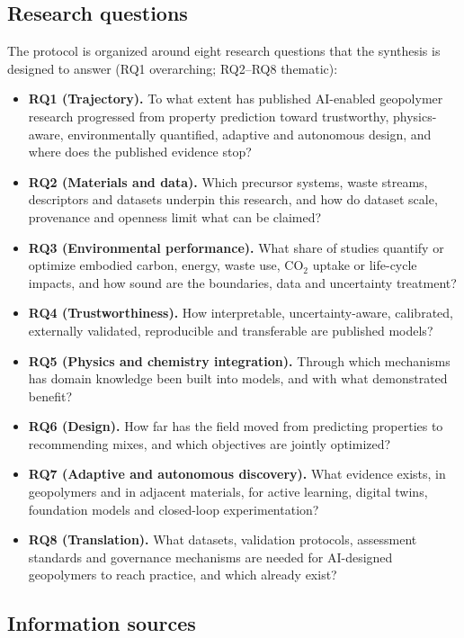 \documentclass[pdflatex,sn-basic]{sn-jnl}
\begin{document}
\subsection{Research questions}

The protocol is organized around eight research questions that the synthesis is designed to answer (RQ1 overarching; RQ2--RQ8 thematic):

\begin{itemize}
\renewcommand\labelitemi{$\bullet$}
\item \textbf{RQ1 (Trajectory).} To what extent has published AI-enabled geopolymer research progressed from property prediction toward trustworthy, physics-aware, environmentally quantified, adaptive and autonomous design, and where does the published evidence stop?
\item \textbf{RQ2 (Materials and data).} Which precursor systems, waste streams, descriptors and datasets underpin this research, and how do dataset scale, provenance and openness limit what can be claimed?
\item \textbf{RQ3 (Environmental performance).} What share of studies quantify or optimize embodied carbon, energy, waste use, CO$_2$ uptake or life-cycle impacts, and how sound are the boundaries, data and uncertainty treatment?
\item \textbf{RQ4 (Trustworthiness).} How interpretable, uncertainty-aware, calibrated, externally validated, reproducible and transferable are published models?
\item \textbf{RQ5 (Physics and chemistry integration).} Through which mechanisms has domain knowledge been built into models, and with what demonstrated benefit?
\item \textbf{RQ6 (Design).} How far has the field moved from predicting properties to recommending mixes, and which objectives are jointly optimized?
\item \textbf{RQ7 (Adaptive and autonomous discovery).} What evidence exists, in geopolymers and in adjacent materials, for active learning, digital twins, foundation models and closed-loop experimentation?
\item \textbf{RQ8 (Translation).} What datasets, validation protocols, assessment standards and governance mechanisms are needed for AI-designed geopolymers to reach practice, and which already exist?
\end{itemize}

\subsection{Information sources}
\end{document}
